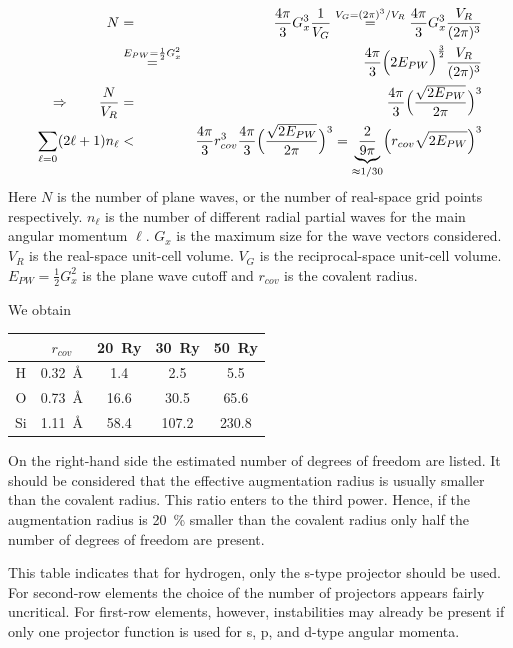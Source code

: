 \documentclass[final,12pt,makeidx,DIV=calc]{article}
\begin{document}
{{{\begin{eqnarray}
N&=&\frac{4\pi}{3}G_x^3\frac{1}{V_G}
\stackrel{V_G=(2\pi)^3/V_R}{=}
\frac{4\pi}{3}G_x^3\frac{V_R}{(2\pi)^3}
\nonumber\\
&\stackrel{E_{PW}=\frac{1}{2}G_x^2}{=}&
\frac{4\pi}{3}\Bigl(2 E_{PW}\Bigr)^\frac{3}{2}\frac{V_R}{(2\pi)^3}
\nonumber\\
\Rightarrow\qquad
\frac{N}{V_R}&=&\frac{4\pi}{3}\Bigl(
\frac{\sqrt{2E_{PW}}}{2\pi}
\Bigr)^3
\nonumber\\
\sum_{\ell=0}(2\ell+1)n_\ell&<&
\frac{4\pi}{3}r_{cov}^3\frac{4\pi}{3}\Bigl(
\frac{\sqrt{2E_{PW}}}{2\pi}
\Bigr)^3
=\underbrace{\frac{2}{9\pi}}_{\approx 1/30}\Bigl(r_{cov}\sqrt{2E_{PW}}\Bigr)^3
\end{eqnarray}
Here $N$ is the number of plane waves, or the number of real-space
grid points respectively. $n_\ell$ is the number of different radial
partial waves for the main angular momentum $\ell$.  $G_x$ is the
maximum size for the wave vectors considered. $V_R$ is the real-space
unit-cell volume. $V_G$ is the reciprocal-space unit-cell
volume. $E_{PW}=\frac{1}{2}G_x^2$ is the plane wave cutoff and
$r_{cov}$ is the covalent radius.


We obtain
\begin{center}
\begin{tabular}{|c|c|c|c|c|}
\hline
  &$r_{cov}$ & 20~Ry & 30~Ry & 50~Ry\\
\hline
H & 0.32~\AA &  1.4 & 2.5  &  5.5\\
O & 0.73~\AA & 16.6 & 30.5 & 65.6\\ 
Si& 1.11~\AA & 58.4 & 107.2 & 230.8\\
\hline
\end{tabular}
\end{center}
On the right-hand side the estimated number of degrees of freedom are
listed. It should be considered that the effective augmentation radius
is usually smaller than the covalent radius. This ratio enters to the
third power. Hence, if the augmentation radius is 20~\% smaller than
the covalent radius only half the number of degrees of freedom are
present.

This table indicates that for hydrogen, only the s-type projector
should be used. For second-row elements the choice of the number of
projectors appears fairly uncritical. For first-row elements, however,
instabilities may already be present if only one projector function
is used for s, p, and d-type angular momenta.


\newpage
}}}
\end{document}
